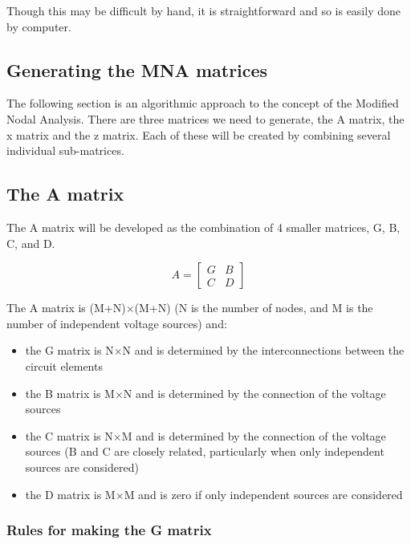 Though this may be difficult by hand, it is straightforward and so is
easily done by computer.

\subsection{Generating the MNA matrices}

The following section is an algorithmic approach to the concept of the
Modified Nodal Analysis.  There are three matrices we need to
generate, the A matrix, the x matrix and the z matrix.  Each of these
will be created by combining several individual sub-matrices.

\subsection{The A matrix}

The A matrix will be developed as the combination of 4 smaller
matrices, G, B, C, and D.

\begin{equation}
A =
\begin{bmatrix}
G & B\\
C & D
\end{bmatrix}
\end{equation}

The A matrix is (M+N)$\times$(M+N) (N is the number of nodes, and M is the
number of independent voltage sources) and:

\begin{itemize}
\item
the G matrix is N$\times$N and is determined by the interconnections
between the circuit elements
\item
the B matrix is M$\times$N and is determined by the connection of the voltage
sources
\item
the C matrix is N$\times$M and is determined by the connection of
the voltage sources (B and C are closely related, particularly when
only independent sources are considered)
\item
the D matrix is M$\times$M and is zero if only independent sources are
considered
\end{itemize}

\subsubsection{Rules for making the G matrix}

